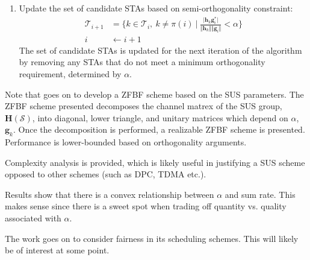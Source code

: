 \begin{enumerate}
    \item Update the set of candidate STAs based on semi-orthogonality constraint:
    \begin{subequations}
        \begin{align}
            \mathcal{T}_{i+1} &= \bigg\lbrace k\in \mathcal{T}_i,\ k\neq \pi(i)\ \big \vert \ \frac{\vert \textbf{h}_k\textbf{g}_i^*\vert}{\Vert \textbf{h}_k \Vert \Vert \textbf{g}_i\Vert} < \alpha  \bigg\rbrace \\
            i &\longleftarrow i+1
        \end{align}
    \end{subequations}
    The set of candidate STAs is updated for the next iteration of the algorithm by  removing any STAs that do not meet a minimum orthogonality requirement, determined by $\alpha$.
\end{enumerate}

Note that \cite{1603708} goes on to develop a ZFBF scheme based on the SUS parameters. The ZFBF scheme presented decomposes the channel matrex of the SUS group, $\textbf{H}(\mathcal{S})$, into diagonal, lower triangle, and unitary matrices which depend on $\alpha$, $\textbf{g}_k$. Once the decomposition is performed, a realizable ZFBF scheme is presented. Performance is lower-bounded based on orthogonality arguments.

Complexity analysis is provided, which is likely useful in justifying a SUS scheme opposed to other schemes (such as DPC, TDMA etc.).

Results show that there is a convex relationship between $\alpha$ and sum rate. This makes sense since there is a sweet spot when trading off quantity vs. quality associated with $\alpha$.

The work goes on to consider fairness in its scheduling schemes. This will likely be of interest at some point.